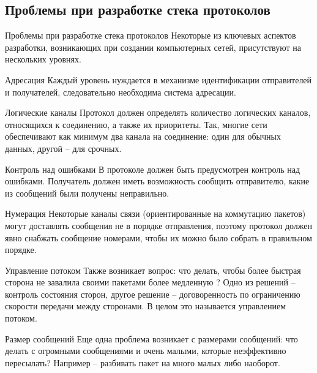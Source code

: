 \subsection{Проблемы при разработке стека протоколов}
\begin{frame}{Проблемы при разработке стека протоколов}
	Некоторые из ключевых аспектов разработки,  возникающих при создании компьютерных сетей,  присутствуют на нескольких уровнях.
\end{frame}

\begin{frame}{Адресация}
	Каждый уровень нуждается в механизме идентификации отправителей и получателей,  следовательно необходима система адресации.
\end{frame}

\begin{frame}{Логические каналы}
	Протокол должен определять количество логических каналов,  относящихся к соединению,  а также их приоритеты. Так,  многие сети обеспечивают как минимум два канала на соединение: один для обычных данных,  другой – для срочных.
\end{frame}

\begin{frame}{Контроль над ошибками}
	В протоколе должен быть предусмотрен контроль над ошибками. Получатель должен иметь возможность сообщить отправителю,  какие из сообщений были получены неправильно.
\end{frame}

\begin{frame}{Нумерация}
	Некоторые каналы связи (ориентированные на коммутацию пакетов) могут доставлять сообщения не в порядке отправления,  поэтому протокол должен явно снабжать сообщение номерами,  чтобы их можно было собрать в правильном порядке.
\end{frame}

\begin{frame}{Управление потоком}
	Также возникает вопрос: что делать,  чтобы более быстрая сторона не завалила своими пакетами более медленную ? Одно из решений – контроль состояния сторон,  другое решение – договоренность по ограничению скорости передачи между сторонами. В целом это называется управлением потоком.
\end{frame}

\begin{frame}{Размер сообщений}
Еще одна проблема возникает с размерами сообщений: что делать с огромными сообщениями и очень малыми,  которые неэффективно пересылать?
Например -- разбивать пакет на много малых либо наоборот.
\end{frame}

